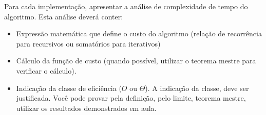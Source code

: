 \documentclass{article}
\begin{document}
Para cada implementação, apresentar a análise de complexidade de tempo do algoritmo. Esta análise deverá conter:

\begin{itemize}
    \item Expressão matemática que define o custo do algoritmo (relação de recorrência para recursivos ou somatórios para iterativos) 
    \item Cálculo da função de custo (quando possível, utilizar o teorema mestre para verificar o cálculo).
    \item Indicação da classe de eficiência ($O$ ou $\Theta$). A indicação da classe, deve ser justificada. Você pode provar pela definição, pelo limite, teorema mestre, utilizar os resultados demonstrados em aula.
\end{itemize}


%
%
\end{document}
